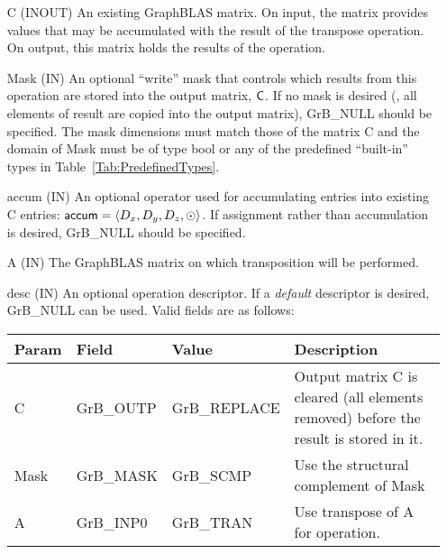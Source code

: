 \begin{itemize}[leftmargin=1.1in]
    \item[{\sf C}]    ({\sf INOUT}) An existing GraphBLAS matrix.  On input,
    the matrix provides values that may be accumulated with the result of the
    transpose operation.  On output, this matrix holds the results of the
    operation.

    \item[{\sf Mask}]  ({\sf IN}) An optional ``write'' mask that controls which
    results from this operation are stored into the output matrix,
    ${\sf C}$.  If no mask is desired (\ie, all elements
    of result are copied into the output matrix), {\sf GrB\_NULL}
    should be specified. The mask dimensions must match those of the
    matrix {\sf C} and the domain of {\sf Mask} must be
    of type {\sf bool} or any of the predefined ``built-in'' types in
    Table~\ref{Tab:PredefinedTypes}.

    \item[{\sf accum}]    ({\sf IN}) An optional operator used for accumulating
    entries into existing {\sf C} entries: ${\sf accum} = \langle D_x,
    D_y, D_z,\odot \rangle$. If assignment rather than accumulation is
    desired, {\sf GrB\_NULL} should be specified.

    \item[{\sf A}]     ({\sf IN}) The GraphBLAS matrix on which
	    transposition will be performed.
    
    \item[{\sf desc}]  ({\sf IN}) An optional operation descriptor.  If a \emph{default}
    descriptor is desired, {\sf GrB\_NULL} can be used.  Valid fields are
    as follows: \\
    
    \begin{tabular}{lllp{2.5in}}
        Param & Field  & Value & Description \\ \hline
        {\sf C}    & {\sf GrB\_OUTP} & {\sf GrB\_REPLACE} & Output matrix {\sf C}
        is cleared (all elements removed) before the result is stored in it. \\
        
	{\sf Mask} & {\sf GrB\_MASK} & {\sf GrB\_SCMP}   & Use the structural complement of {\sf Mask}\\

        {\sf A}    & {\sf GrB\_INP0} & {\sf GrB\_TRAN}   & Use transpose of {\sf A} for operation. 
    \end{tabular}
\end{itemize}

